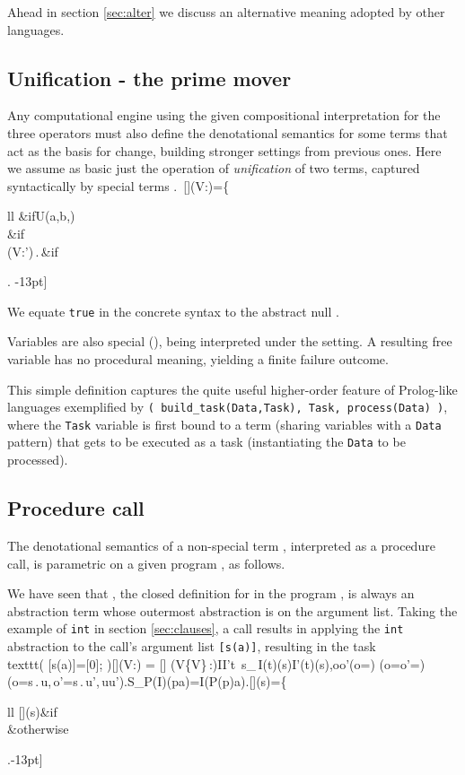 \documentclass{tlp}
\def\around#1#2{#1#2#1}
\newcommand\caseif[1]{\left\{\begin{array}{ll}#1\end{array}\right.}
\newcommand\cond{&\quad\!\!\mbox{if}\quad}
\newcommand\other{&\quad\!\!\mbox{otherwise}}
\def\Bic{\Leftrightarrow}
\def\scor{\around\,\cor}
\def\S{{\cal S}}               \def\T{{\cal T}}               \def\V{{\cal V}}               \def\dlt{\triangle}
\def\denotstart{[\![\,}
\def\denotend{\,]\!]}
\def\denot#1{\denotstart#1\denotend}
\def\A{\mathcal A}
\def\Stng{\S}
\def\Ss{\Sigma}
\def\s{\sigma}
\def\appl#1#2{#1\applsym#2}
\def\abstsym{\!\cdot\!}
\def\abst#1#2{\lambda#1\abstsym#2}
\def\fv#1{\widehat{#1}}
\def\obeq{\,\texttt{=}\,}
\def\mtt#1{\mbox{\tt #1}}
\def\stng#1#2{#1\!\!:\!#2}
\def\ff{\emptyset}
\def\soutsym{{\,.\,}}
\def\sout#1#2{#1\soutsym#2}
\def\unfr{\rightarrow}
\newcommand{\unfa}[3][\s]{U(#2,#3,#1)}
\newcommand{\Unf}[4][{}]{\unfa{#2}{#3}#1\unfr#4}
\newcommand{\apply}[2]{#1\bullet#2}
\newcommand{\next}[1]{\check #1}
\newcommand{\stp}{S_P}
\begin{document}
Ahead in section \ref{sec:alter} we discuss an alternative meaning adopted by
other languages.

\subsection{Unification - the prime mover}

Any computational engine using the given compositional
interpretation for the three operators must also define the
denotational semantics for some terms that act as the basis for
change, building stronger settings from
previous ones.
Here we assume as basic just the operation of
\emph{unification} of two terms, captured syntactically by special
terms .\
\denot{a\obeq b}(\stng V\s)=\caseif{
\infty\cond \Unf[\not]ab{}\\
\ff\cond{\Unf ab\bot}\\
\sout{(\stng V{\s'})}{\ff}\cond{\Unf ab{\s'\in\Ss}}}
-13pt]

We equate \texttt{true} in the concrete syntax to the abstract null .

Variables are also special (), being interpreted under the
setting. A resulting free variable has no procedural meaning, yielding a finite failure
outcome.


\noindent This simple definition captures the quite useful higher-order
feature of Prolog-like languages exemplified by
\verb=( build_task(Data,Task), Task, process(Data) )=, where the \verb+Task+
variable is first
bound to a term (sharing variables with a \verb+Data+ pattern) that gets to be
executed as a task
(instantiating the \verb+Data+ to be processed).

\subsection{Procedure call}

The denotational semantics of a non-special term , interpreted as a procedure
call, is parametric on a given program , as follows.

We have seen that , the closed
definition for  in the program , is
always an abstraction term whose outermost abstraction is on the argument list.
Taking the example of \texttt{int} in section \ref{sec:clauses}, a call
 results in
applying the {\tt int}
abstraction to the call's argument list
\texttt{[s(a)]}, resulting in the task\\texttt{( [s(a)]=[0];  )}\denot{\abst vt}(\stng V\s) = \denot{\apply{(\abst vt)}{\next V}}
(\stng{V\cup\{\next V\}\,}\s)I\sqsubseteq I'\quad\Bic\quad\forall t\in\T\;\,\forall
s\in\Stng_{\fv{t}}\;\,I(t)(s)\sqsubseteq I'(t)(s)\;,o\sqsubseteq o'\quad\Bic\quad(o=\infty)\scor(o=o'=\ff)\scor(o=\sout
su,\,o'=\sout s{u'},\,u\sqsubseteq u')\;.\stp(I)(\appl pa)=I(\apply{P(p)}a)\;.\denot{x\;\mtt{is}\;e}(s)=\caseif{
\denot{x\obeq y}(s)\cond{^\A\denot e(s)=y}\\
\ff\other
}-13pt]
\end{document}
